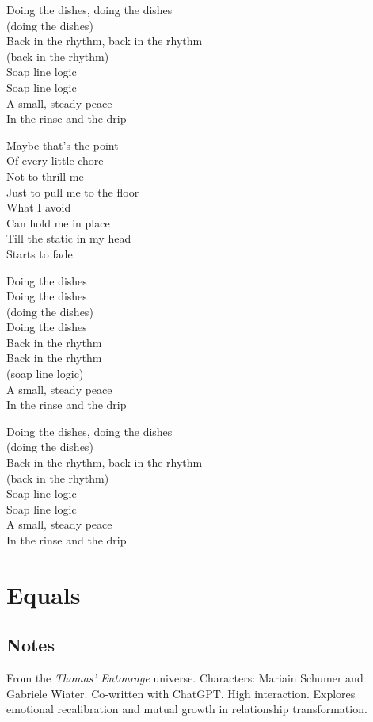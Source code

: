 \begin{lyrics}
Doing the dishes, doing the dishes\\
(doing the dishes)\\
Back in the rhythm, back in the rhythm\\
(back in the rhythm)\\
Soap line logic\\
Soap line logic\\
A small, steady peace\\
In the rinse and the drip

Maybe that’s the point\\
Of every little chore\\
Not to thrill me\\
Just to pull me to the floor\\
What I avoid\\
Can hold me in place\\
Till the static in my head\\
Starts to fade

Doing the dishes\\
Doing the dishes\\
(doing the dishes)\\
Doing the dishes\\
Back in the rhythm\\
Back in the rhythm\\
(soap line logic)\\
A small, steady peace\\
In the rinse and the drip

Doing the dishes, doing the dishes\\
(doing the dishes)\\
Back in the rhythm, back in the rhythm\\
(back in the rhythm)\\
Soap line logic\\
Soap line logic\\
A small, steady peace\\
In the rinse and the drip

\end{lyrics}

\section{Equals}

\subsection{Notes}
From the \emph{Thomas' Entourage} universe.
Characters: Mariain Schumer and Gabriele Wiater.
Co-written with ChatGPT. High interaction.
Explores emotional recalibration and mutual growth in relationship transformation.

